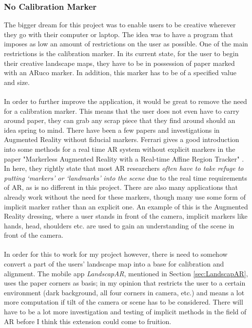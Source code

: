 \documentclass[11pt]{article}
\begin{document}
\subsubsection{No Calibration Marker}
The bigger dream for this project was to enable users to be creative 
wherever they go with their computer or laptop. The idea was to have a
program that imposes as low an amount of restrictions on the user as 
possible. One of the main restrictions is the calibration marker. In its
current state, for the user to begin their creative landscape maps, they
have to be in possession of paper marked with an ARuco marker. In addition,
this marker has to be of a specified value and size. \\
\\
In order to further improve the application, it would be great to remove 
the need for a calibration marker. This means that the user does not even 
have to carry around paper, they can grab any scrap piece that they find 
around should an idea spring to mind. There have been a few papers and
investigations in Augmented Reality without fiducial markers. Ferrari
gives a good introduction into some methods for a real time AR
system without explicit markers in the paper "Markerless Augmented 
Reality with a Real-time Affine Region Tracker" \cite{Ferrari}. In here, they
rightly state that most AR researchers \textit{often
have to take refuge to putting ‘markers’ or ‘landmarks’ into the scene} 
due to the real time requirements of AR, as is no different in this project.
There are also many applications that already work without the need for these markers,
though many use some form of implicit marker rather than an explicit one.
An example of this is the Augmented Reality dressing, where a user 
stands in front of the camera, implicit markers like hands, head, shoulders
etc. are used to gain an understanding of the scene in front of the camera.\\
\\
In order for this to work for my project however, there is need to
somehow convert a part of the users' landscape map into a base for 
calibration and alignment. The mobile app \textit{LandscapAR}, mentioned
in Section \ref{sec:LandscapAR}, uses the paper corners as basis; in my
opinion that restricts the user to a certain environment (dark background,
all four corners in camera, etc.) and means a lot more computation if
tilt of the camera or scene has to be considered. There will have to be
a lot more investigation and testing of implicit methods in the field of
AR before I think this extension could come to fruition.
\end{document}
